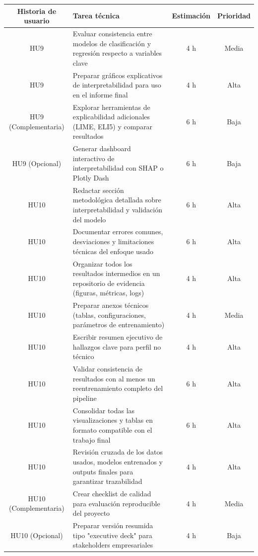 \documentclass[
11pt, %
]{charter}
\begin{document}
\begin{table}[htpb]
\centering
\begin{tabularx}{\linewidth}{@{}|c|X|c|c|@{}}
\hline
\rowcolor[HTML]{C0C0C0}
Historia de usuario & Tarea técnica & Estimación & Prioridad \\ \hline

HU9 & Evaluar consistencia entre modelos de clasificación y regresión respecto a variables clave & 4 h & Media \\ \hline
HU9 & Preparar gráficos explicativos de interpretabilidad para uso en el informe final & 4 h & Alta \\ \hline
HU9 (Complementaria) & Explorar herramientas de explicabilidad adicionales (LIME, ELI5) y comparar resultados & 6 h & Baja \\ \hline
HU9 (Opcional) & Generar dashboard interactivo de interpretabilidad con SHAP o Plotly Dash & 6 h & Baja \\ \hline

HU10 & Redactar sección metodológica detallada sobre interpretabilidad y validación del modelo & 6 h & Alta \\ \hline
HU10 & Documentar errores comunes, desviaciones y limitaciones técnicas del enfoque usado & 6 h & Alta \\ \hline
HU10 & Organizar todos los resultados intermedios en un repositorio de evidencia (figuras, métricas, logs) & 4 h & Alta \\ \hline
HU10 & Preparar anexos técnicos (tablas, configuraciones, parámetros de entrenamiento) & 4 h & Media \\ \hline
HU10 & Escribir resumen ejecutivo de hallazgos clave para perfil no técnico & 4 h & Alta \\ \hline
HU10 & Validar consistencia de resultados con al menos un reentrenamiento completo del pipeline & 6 h & Alta \\ \hline
HU10 & Consolidar todas las visualizaciones y tablas en formato compatible con el trabajo final & 6 h & Alta \\ \hline
HU10 & Revisión cruzada de los datos usados, modelos entrenados y outputs finales para garantizar trazabilidad & 4 h & Alta \\ \hline


HU10 (Complementaria) & Crear checklist de calidad para evaluación reproducible del proyecto & 4 h & Media \\ \hline
HU10 (Opcional) & Preparar versión resumida tipo "executive deck" para stakeholders empresariales & 4 h & Baja \\ \hline


\end{tabularx}
\end{table}
\end{document}
